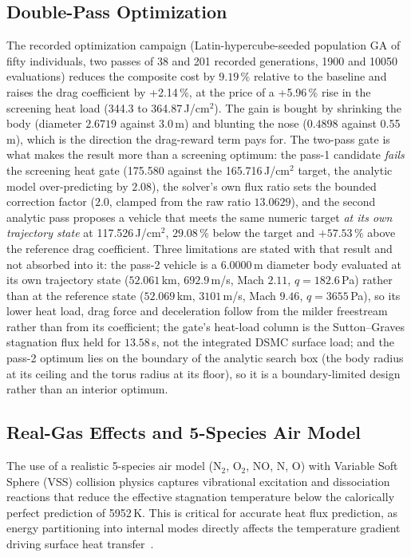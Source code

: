 \subsection{Double-Pass Optimization}
The recorded optimization campaign (Latin-hypercube-seeded population GA of fifty individuals, two passes of 38 and 201 recorded generations, 1900 and 10050 evaluations) reduces the composite cost by $9.19\,\%$ relative to the baseline and raises the drag coefficient by +2.14\,\%, at the price of a +5.96\,\% rise in the screening heat load (344.3 to 364.87\,J/cm$^2$). The gain is bought by shrinking the body (diameter $2.6719$ against 3.0\,m) and blunting the nose ($0.4898$ against 0.55\,m), which is the direction the drag-reward term pays for. The two-pass gate is what makes the result more than a screening optimum: the pass-1 candidate \emph{{fails}} the screening heat gate (175.580 against the 165.716\,J/cm$^2$ target, the analytic model over-predicting by $2.08$), the solver's own flux ratio sets the bounded correction factor ($2.0$, clamped from the raw ratio $13.0629$), and the second analytic pass proposes a vehicle that meets the same numeric target \emph{at its own trajectory state} at 117.526\,J/cm$^2$, $29.08\,\%$ below the target and $+57.53\,\%$ above the reference drag coefficient. Three limitations are stated with that result and not absorbed into it: the pass-2 vehicle is a $6.0000$\,m diameter body evaluated at its own trajectory state ($52.061$\,km, $692.9$\,m/s, Mach $2.11$, $q = 182.6$\,Pa) rather than at the reference state ($52.069$\,km, $3101$\,m/s, Mach $9.46$, $q = 3655$\,Pa), so its lower heat load, drag force and deceleration follow from the milder freestream rather than from its coefficient; the gate's heat-load column is the Sutton--Graves stagnation flux held for $13.58$\,s, not the integrated DSMC surface load; and the pass-2 optimum lies on the boundary of the analytic search box (the body radius at its ceiling and the torus radius at its floor), so it is a boundary-limited design rather than an interior optimum.

\subsection{Real-Gas Effects and 5-Species Air Model}
The use of a realistic 5-species air model (N$_2$, O$_2$, NO, N, O) with Variable Soft Sphere (VSS) collision physics captures vibrational excitation and dissociation reactions that reduce the effective stagnation temperature below the calorically perfect prediction of 5952\,K. This is critical for accurate heat flux prediction, as energy partitioning into internal modes directly affects the temperature gradient driving surface heat transfer~\cite{AndersonHypersonic}.

